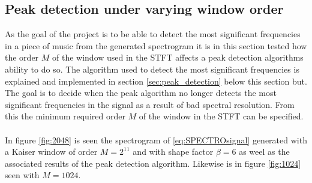 \subsection{Peak detection under varying window order}
As the goal of the project is to be able to detect the most significant frequencies in a piece of music from the generated spectrogram it is in this section tested how the order $M$ of the window used in the STFT affects a peak detection algorithms ability to do so. The algorithm used to detect the most significant frequencies is explained and implemented in section \ref{sec:peak_detection} below this section but. The goal is to decide when the peak algorithm no longer detects the most significant frequencies in the signal as a result of bad spectral resolution. From this the minimum required order $M$ of the window in the STFT can be specified.\\\\
In figure \ref{fig:2048} is seen the spectrogram of \ref{eq:SPECTROsignal} generated with a Kaiser window of order $M=2^{11}$ and with shape factor $\beta=6$ as weel as the associated results of the peak detection algorithm. Likewise is in figure \ref{fig:1024} seen with $M=1024$.
